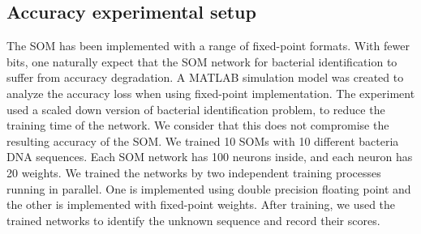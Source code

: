 \subsection{Accuracy experimental setup}\label{ex_setup}
The SOM has been implemented with a range of fixed-point formats. With fewer bits, one naturally expect that the SOM network for bacterial identification to suffer from accuracy degradation. A MATLAB simulation model was created to analyze the accuracy loss when using fixed-point implementation. The experiment used a scaled down version of bacterial identification problem, to reduce the training time of the network. We consider that this does not compromise the resulting accuracy of the SOM. We trained 10 SOMs with 10 different bacteria DNA sequences. Each SOM network has 100 neurons inside, and each neuron has 20 weights. We trained the networks by two independent training processes running in parallel. One is implemented using double precision floating point and the other is implemented with fixed-point weights. After training, we used the trained networks to identify the unknown sequence and record their scores.

